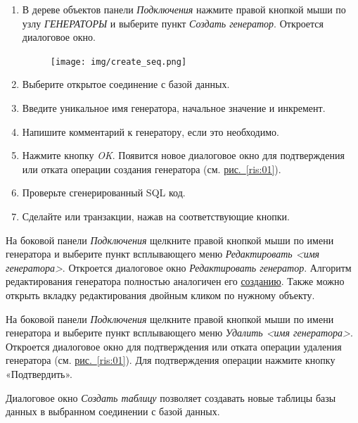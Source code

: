 \begin{enumerate}[leftmargin=26pt]
	\item  В дереве объектов панели \textit{Подключения} нажмите правой кнопкой мыши по узлу \textit{ГЕНЕРАТОРЫ} и выберите пункт \textit{Создать генератор}. Откроется диалоговое окно.
	\begin{figure}[H]
		\centering
		\texttt{[image: img/create\_seq.png]}
	\end{figure}
	\item Выберите открытое соединение с базой данных.
	\item Введите уникальное имя генератора, начальное значение и инкремент.
	\item Напишите комментарий к генератору, если это необходимо.
	\item Нажмите кнопку \textit{OK}. Появится новое диалоговое окно для подтверждения или отката операции создания генератора (см. \hyperref[ris:01]{рис.~\ref{ris:01}}).
	\item Проверьте сгенерированный SQL код.
	\item Сделайте  или  транзакции, нажав на соответствующие кнопки.
\end{enumerate}

На боковой панели \textit{Подключения} щелкните правой кнопкой мыши по имени генератора и выберите пункт всплывающего меню \textit{Редактировать <имя генератора>}. Откроется диалоговое окно \textit{Редактировать генератор}. Алгоритм редактирования генератора полностью аналогичен его \hyperref[sec:crseq]{созданию}.
Также можно открыть вкладку редактирования двойным кликом по нужному объекту. 

На боковой панели \textit{Подключения} щелкните правой кнопкой мыши по имени генератора и выберите пункт всплывающего меню \textit{Удалить <имя генератора>}. Откроется  диалоговое окно для подтверждения или отката операции удаления генератора (см. \hyperref[ris:01]{рис.~\ref{ris:01}}). Для подтверждения операции нажмите кнопку «Подтвердить».


\label{sec:111}

Диалоговое окно \textit{Создать таблицу} позволяет создавать новые таблицы базы данных в выбранном соединении с базой данных.

